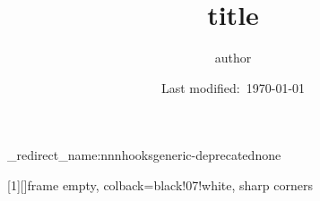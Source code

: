 \usepackage[T1]{fontenc}
\usepackage{tgtermes}

\setcounter{tocdepth}{3}

\usepackage{a4wide}

\usepackage{amssymb,amsfonts,amsthm,mathtools}
\usepackage{physics,braket,bm,slashed}

\usepackage[normalem]{ulem}

\usepackage{cancel}

\usepackage{fancybox,ascmac}

\theoremstyle{definition}
\newtheorem{dfn}{Definition}
\newtheorem{prop}{Proposition}
\newtheorem{thm}{Theorem}

\renewcommand{\proofname}{\textbf{Proof}}
\renewcommand{\qedsymbol}{$\blacksquare$}

\usepackage{silence}
\ExplSyntaxOn
\msg_redirect_name:nnn{hooks}{generic-deprecated}{none}
\ExplSyntaxOff


\usepackage{url,hyperref}
\usepackage[dvipsnames,svgnames]{xcolor}
\hypersetup{colorlinks=true,citecolor=FireBrick,linkcolor=Navy,urlcolor=purple}

\usepackage{tikz,pgf,pgfplots,circuitikz}
\pgfplotsset{compat=1.15}
\usetikzlibrary{intersections, arrows.meta, angles, calc, 3d, decorations.pathmorphing}
\usepackage[compat=1.1.0]{tikz-feynhand}

\usepackage{tcolorbox}
[1][]{frame empty, colback=black!07!white, sharp corners}

\makeatletter
   \renewcommand{\theequation}{$\thesection.\arabic{equation}$}
   
   \renewcommand{\thefigure}{\thesection.\arabic{figure}}
   
   \renewcommand{\thetable}{\thesection.\arabic{table}}
\makeatother



\renewcommand{\thefootnote}{$\ast$\arabic{footnote}}

\title{title}
\author{author}
\date{Last modified:\ \today}
